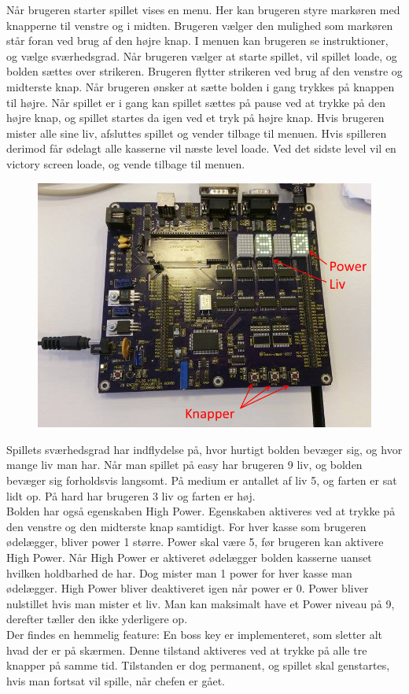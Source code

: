 Når brugeren starter spillet vises en menu. Her kan brugeren styre markøren med knapperne til venstre og i midten. Brugeren vælger den mulighed som markøren står foran ved brug af den højre knap. I menuen kan brugeren se instruktioner, og vælge sværhedsgrad. Når brugeren vælger at starte spillet, vil spillet loade, og bolden sættes over strikeren. Brugeren flytter strikeren ved brug af den venstre og midterste knap. Når brugeren ønsker at sætte bolden i gang trykkes på knappen til højre. Når spillet er i gang kan spillet sættes på pause ved at trykke på den højre knap, og spillet startes da igen ved et tryk på højre knap. Hvis brugeren mister alle sine liv, afsluttes spillet og vender tilbage til menuen. Hvis spilleren derimod får ødelagt alle kasserne vil næste level loade. Ved det sidste level vil en victory screen loade, og vende tilbage til menuen. \\
\begin{figure}[h]
\begin{center}
\includegraphics[scale=0.6]{img/board.png}
\end{center}
\end{figure}
Spillets sværhedsgrad har indflydelse på, hvor hurtigt bolden bevæger sig, og hvor mange liv man har. Når man spillet på easy har brugeren 9 liv, og bolden bevæger sig forholdsvis langsomt. På medium er antallet af liv 5, og farten er sat lidt op. På hard har brugeren 3 liv og farten er høj.
\\
Bolden har også egenskaben High Power. Egenskaben aktiveres ved at trykke på den venstre og den midterste knap samtidigt.  For hver kasse som brugeren ødelægger, bliver power 1 større. Power skal være 5, før brugeren kan aktivere High Power. Når High Power er aktiveret ødelægger bolden kasserne uanset hvilken holdbarhed de har. Dog mister man 1 power for hver kasse man ødelægger. High Power bliver deaktiveret igen når power er 0. Power  bliver nulstillet hvis man mister et liv. Man kan maksimalt have et Power niveau på 9, derefter tæller den ikke yderligere op. \\

Der findes en hemmelig feature: En boss key er implementeret, som sletter alt hvad der er på skærmen. Denne tilstand aktiveres ved at trykke på alle tre knapper på samme tid. Tilstanden er dog permanent, og spillet skal genstartes, hvis man fortsat vil spille, når chefen er gået. 
